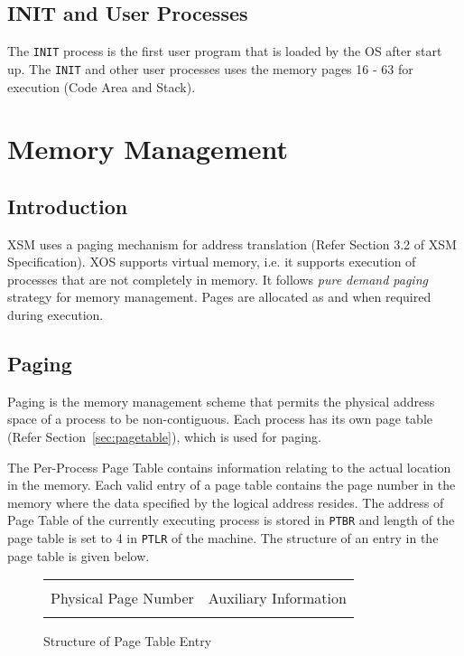 \documentclass[10pt]{report}
\begin{document}
\section{INIT and User Processes}
\label{sec:init and userprogs}

The \texttt{INIT} process is the first user program that is loaded by the OS after start up. The \texttt{INIT} and other user processes uses the memory pages 16 - 63 for execution (Code Area and Stack). 





\chapter{Memory Management}
\label{chp:memory management}
\section{Introduction}

XSM uses a paging mechanism for address translation (Refer Section 3.2 of XSM Specification). XOS supports virtual memory, i.e. it supports execution of processes that are not completely in memory. It follows \textit{pure demand paging} strategy for memory management. Pages are allocated as and when required during execution. 

\section{Paging}
\label{sec:paging}

Paging is the memory management scheme that permits the physical address space of a process to be non-contiguous. Each process has its own page table (Refer Section~\ref{sec:pagetable}), which is used for paging. 

 The Per-Process Page Table contains information relating to the actual location in the memory. Each valid entry of a page table contains the page number in the memory where the data specified by the logical address resides. The address of Page Table of the currently executing process is stored in \texttt{PTBR} and length of the page table is set to 4 in \texttt{PTLR} of the machine. The structure of an entry in the page table is given below.

		\begin{figure}[htp!]
		\centering
		\begin{tabular}{|c|c|}
		\hline
		  	 	& 			\\ 
		 	Physical Page Number & Auxiliary Information  \\
			 	& 			\\  \hline
		\end{tabular}
		\caption{Structure of Page Table Entry}
		\label{fig:pagetable entry}
	\end{figure}
\end{document}
